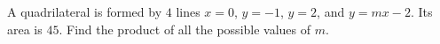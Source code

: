 A quadrilateral is formed by $4$ lines $x=0$, $y=-1$, $y=2$, and $y=mx-2$. Its area is $45$. Find the product of all the possible values of $m$.
